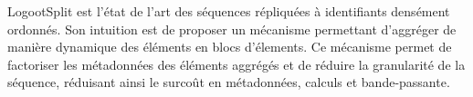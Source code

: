 \label{sec:logootsplit}

LogootSplit \cite{2013-logootsplit} est l'état de l'art des séquences répliquées à identifiants densément ordonnés.
Son intuition est de proposer un mécanisme permettant d'aggréger de manière dynamique des éléments en blocs d'élements.
Ce mécanisme permet de factoriser les métadonnées des éléments aggrégés et de réduire la granularité de la séquence, réduisant ainsi le surcoût en métadonnées, calculs et bande-passante.
